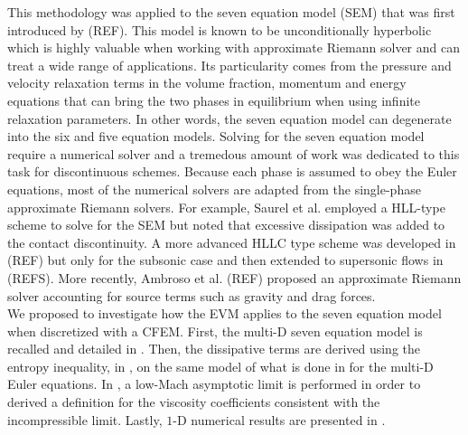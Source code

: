 This methodology was applied to the seven equation model (SEM) that was first introduced by (REF). This model is known to be unconditionally hyperbolic which is highly valuable when working with approximate Riemann solver and can treat a wide range of applications. Its particularity comes from the pressure and velocity relaxation terms in the volume fraction, momentum and energy equations that can bring the two phases in equilibrium when using infinite relaxation parameters. In other words, the seven equation model can degenerate into the six and five equation models. Solving for the seven equation model require a numerical solver and a tremedous amount of work was dedicated to this task for discontinuous schemes. Because each phase is assumed to obey the Euler equations, most of the numerical solvers are adapted from the single-phase approximate Riemann solvers. For example, Saurel et al. employed a HLL-type scheme to solve for the SEM but noted that excessive dissipation was added to the contact discontinuity. A more advanced HLLC type scheme was developed in (REF) but only for the subsonic case and then extended to supersonic flows in (REFS). More recently, Ambroso et al. (REF) proposed an approximate Riemann solver accounting for source terms such as gravity and drag forces.\\

 We proposed to investigate how the EVM applies to the seven equation model when discretized with a CFEM. First, the multi-D seven equation model is recalled and detailed in . Then, the dissipative terms are derived using the entropy inequality, in , on the same model of what is done in  for the multi-D Euler equations. In , a low-Mach asymptotic limit is performed in order to derived a definition for the viscosity coefficients consistent with the incompressible limit. Lastly, $1$-D numerical results are presented in .
